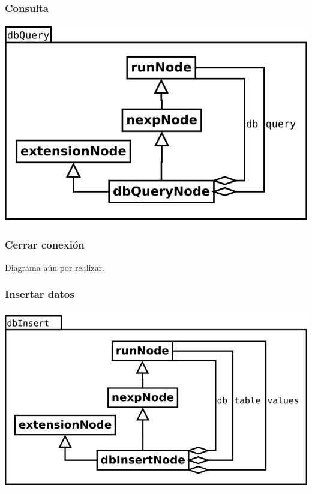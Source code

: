 \subsubsection {Consulta}
\begin{center}
\includegraphics[scale=0.4]{dbQuery.png} \\
\end{center}

\subsubsection {Cerrar conexión}
Diagrama aún por realizar.

\subsubsection {Insertar datos}
\begin{center}
\includegraphics[scale=0.4]{dbInsert.png} \\
\end{center}

